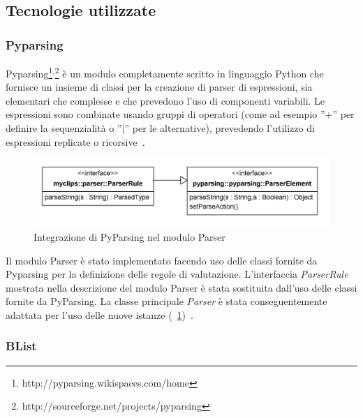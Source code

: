 \subsection{Tecnologie utilizzate}

\subsubsection{Pyparsing}
Pyparsing\footnote{http://pyparsing.wikispaces.com/home}$^,$\footnote{http://sourceforge.net/projects/pyparsing} è un modulo completamente scritto in linguaggio Python che fornisce un insieme di classi per la creazione di parser di espressioni, sia elementari che complesse e che prevedono l'uso di componenti variabili. Le espressioni sono combinate usando gruppi di operatori (come ad esempio ''+'' per definire la sequenzialità o ''$\mid$'' per le alternative), prevedendo l'utilizzo di espressioni replicate o ricorsive~\cite{pyparsing-gs}.

\begin{figure}[h]
\centering
\includegraphics[width=1\textwidth]{Immagini/Capitolo3/Classi/myclips_parser_PyParsing.png}
\caption[Integrazione di PyParsing nel modulo Parser]{Integrazione di PyParsing nel modulo Parser}\label{fig:class-myclips-parser-pyparsing}
\end{figure}

Il modulo Parser è stato implementato facendo uso delle classi fornite da Pyparsing per la definizione delle regole di valutazione. L'interfaccia \emph{ParserRule} mostrata nella descrizione del modulo Parser è stata sostituita dall'uso delle classi fornite da PyParsing. La classe principale \emph{Parser} è stata conseguentemente adattata per l'uso delle nuove istanze (\figurename~\ref{fig:class-myclips-parser-pyparsing})~\cite{pyparsing-apidoc}.

\subsubsection{BList}

